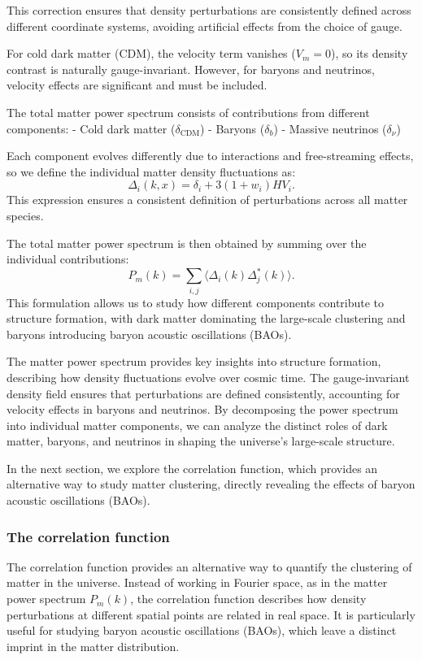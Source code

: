\documentclass{aa}
\begin{document}
This correction ensures that density perturbations are consistently defined across different coordinate systems, avoiding artificial effects from the choice of gauge.  

For cold dark matter (CDM), the velocity term vanishes ($V_m = 0$), so its density contrast is naturally gauge-invariant. However, for baryons and neutrinos, velocity effects are significant and must be included.

The total matter power spectrum consists of contributions from different components:  
- Cold dark matter ($\delta_{\text{CDM}}$)  
- Baryons ($\delta_b$)  
- Massive neutrinos ($\delta_\nu$)  

Each component evolves differently due to interactions and free-streaming effects, so we define the individual matter density fluctuations as:
\begin{equation}
\Delta_i(k, x) = \delta_i + 3(1 + w_i) H V_i.
\end{equation}
This expression ensures a consistent definition of perturbations across all matter species.  

The total matter power spectrum is then obtained by summing over the individual contributions:
\begin{equation}
P_m(k) = \sum_{i, j} \langle \Delta_i(k) \Delta_j^*(k) \rangle.
\end{equation}
This formulation allows us to study how different components contribute to structure formation, with dark matter dominating the large-scale clustering and baryons introducing baryon acoustic oscillations (BAOs).

The matter power spectrum provides key insights into structure formation, describing how density fluctuations evolve over cosmic time. The gauge-invariant density field ensures that perturbations are defined consistently, accounting for velocity effects in baryons and neutrinos. By decomposing the power spectrum into individual matter components, we can analyze the distinct roles of dark matter, baryons, and neutrinos in shaping the universe's large-scale structure.  

In the next section, we explore the correlation function, which provides an alternative way to study matter clustering, directly revealing the effects of baryon acoustic oscillations (BAOs).
\color{black}





\subsubsection{The correlation function}
\color{Plum}
The correlation function provides an alternative way to quantify the clustering of matter in the universe. Instead of working in Fourier space, as in the matter power spectrum $P_m(k)$, the correlation function describes how density perturbations at different spatial points are related in real space. It is particularly useful for studying baryon acoustic oscillations (BAOs), which leave a distinct imprint in the matter distribution.
\end{document}
